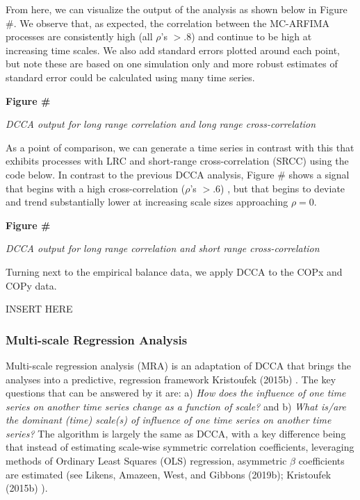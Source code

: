 \documentclass[
  man]{apa6}
\begin{document}
From here, we can visualize the output of the analysis as shown below in
Figure \#. We observe that, as expected, the correlation between the
MC-ARFIMA processes are consistently high (all \(\rho\)'s \(> .8\)) and
continue to be high at increasing time scales. We also add standard
errors plotted around each point, but note these are based on one
simulation only and more robust estimates of standard error could be
calculated using many time series.

\textbf{Figure \#}

\emph{DCCA output for long range correlation and long range
cross-correlation}

As a point of comparison, we can generate a time series in contrast with
this that exhibits processes with LRC and short-range cross-correlation
(SRCC) using the code below. In contrast to the previous DCCA analysis,
Figure \# shows a signal that begins with a high cross-correlation
(\(\rho\)'s \(> .6\)) , but that begins to deviate and trend substantially
lower at increasing scale sizes approaching \(\rho = 0\).

\textbf{Figure \#}

\emph{DCCA output for long range correlation and short range
cross-correlation}

Turning next to the empirical balance data, we apply DCCA to the COPx
and COPy data.

INSERT HERE

\hypertarget{multi-scale-regression-analysis}{%
\subsubsection{Multi-scale Regression Analysis}\label{multi-scale-regression-analysis}}

Multi-scale regression analysis (MRA) is an adaptation of DCCA that
brings the analyses into a predictive, regression framework
Kristoufek (2015b) . The key questions that can be answered by it are: a)
\emph{How does the influence of one time series on another time series change
as a function of scale?} and b) \emph{What is/are the dominant (time)
scale(s) of influence of one time series on another time series?} The
algorithm is largely the same as DCCA, with a key difference being that
instead of estimating scale-wise symmetric correlation coefficients,
leveraging methods of Ordinary Least Squares (OLS) regression,
asymmetric \(\beta\) coefficients are estimated (see Likens, Amazeen, West, and Gibbons (2019b);
Kristoufek (2015b) ).
\end{document}
